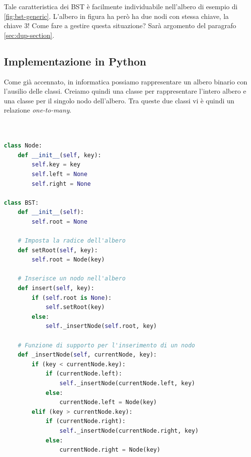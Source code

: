 \documentclass{article}
\begin{document}
Tale caratteristica dei BST è facilmente individuabile nell'albero di esempio di \cref{fig:bst-generic}. L'albero in figura ha però ha due nodi con stessa chiave, la chiave 3!
Come fare a gestire questa situazione? Sarà argomento del paragrafo \ref{sec:dup-section}.



\subsection{Implementazione in Python}

Come già accennato, in informatica possiamo rappresentare un albero binario con l'ausilio delle classi. Creiamo quindi una classe per rappresentare l'intero albero e una classe per il singolo nodo dell'albero. Tra queste due classi vi è quindi un relazione 
\textit{one-to-many}.

\vspace{5pt}

\begin{lstlisting}[language=Python, caption={Implementazione di un BST}, label=bst-implementation]


class Node:
    def __init__(self, key):
        self.key = key
        self.left = None
        self.right = None

class BST:
    def __init__(self):
        self.root = None

    # Imposta la radice dell'albero
    def setRoot(self, key):
        self.root = Node(key)

    # Inserisce un nodo nell'albero
    def insert(self, key):
        if (self.root is None):
            self.setRoot(key)
        else:
            self._insertNode(self.root, key)

    # Funzione di supporto per l'inserimento di un nodo
    def _insertNode(self, currentNode, key):
        if (key < currentNode.key):
            if (currentNode.left):
                self._insertNode(currentNode.left, key)
            else:
                currentNode.left = Node(key)
        elif (key > currentNode.key):
            if (currentNode.right):
                self._insertNode(currentNode.right, key)
            else:
                currentNode.right = Node(key)
\end{lstlisting}

\vspace{5pt}
\end{document}
